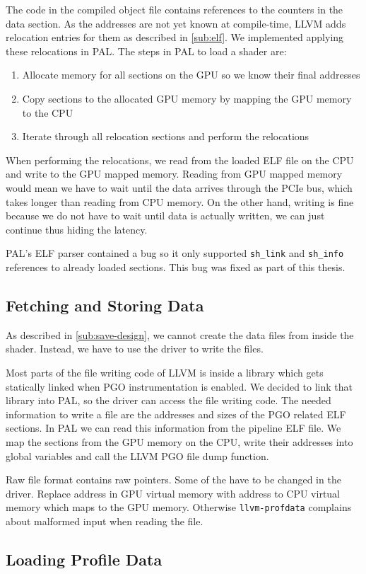 The code in the compiled object file contains references to the counters in the data section. As the addresses are not yet known at compile-time, LLVM adds relocation entries for them as described in \cref{sub:elf}. We implemented applying these relocations in PAL. The steps in PAL to load a shader are:
\begin{enumerate}
	\item Allocate memory for all sections on the GPU so we know their final addresses
	\item Copy sections to the allocated GPU memory by mapping the GPU memory to the CPU
	\item Iterate through all relocation sections and perform the relocations
\end{enumerate}
When performing the relocations, we read from the loaded ELF file on the CPU and write to the GPU mapped memory. Reading from GPU mapped memory would mean we have to wait until the data arrives through the PCIe bus, which takes longer than reading from CPU memory. On the other hand, writing is fine because we do not have to wait until data is actually written, we can just continue thus hiding the latency.

PAL's ELF parser contained a bug so it only supported \texttt{sh\_link} and \texttt{sh\_info} references to already loaded sections. This bug was fixed as part of this thesis.


\subsection{Fetching and Storing Data}
\label{sub:save}
As described in \cref{sub:save-design}, we cannot create the data files from inside the shader. Instead, we have to use the driver to write the files.

Most parts of the file writing code of LLVM is inside a library which gets statically linked when PGO instrumentation is enabled. We decided to link that library into PAL, so the driver can access the file writing code. The needed information to write a file are the addresses and sizes of the PGO related ELF sections. In PAL we can read this information from the pipeline ELF file. We map the sections from the GPU memory on the CPU, write their addresses into global variables and call the LLVM PGO file dump function.

Raw file format contains raw pointers. Some of the have to be changed in the driver.
Replace address in GPU virtual memory with address to CPU virtual memory which maps to the GPU memory.
Otherwise \texttt{llvm-profdata} complains about malformed input when reading the file.

\subsection{Loading Profile Data}
\label{sub:load}